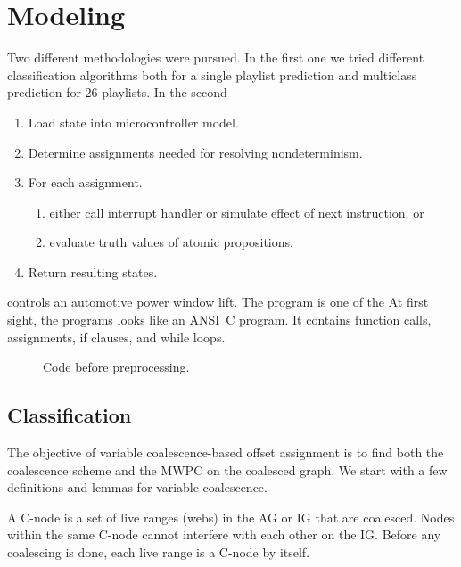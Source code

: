 \documentclass[acmtog, authorversion]{acmart}
\begin{document}
\section{Modeling}
\label{sec:sim}

Two different methodologies were pursued. In the first one we tried different classification algorithms both for a single playlist prediction and multiclass prediction for 26 playlists. In the second
\begin{enumerate}
\item Load state into microcontroller model.
\item Determine assignments needed for resolving nondeterminism.
\item For each assignment.
      \begin{enumerate}
      \item either call interrupt handler or simulate effect of next instruction, or
      \item evaluate truth values of atomic propositions.
      \end{enumerate}
\item Return resulting states.
\end{enumerate}
controls an automotive power window lift. The program is one of the
At first sight, the programs looks like an ANSI~C program. It
contains function calls, assignments, if clauses, and while loops.
\begin{figure}
  \caption{Code before preprocessing.}
  \label{fig:one}
\end{figure}

\subsection{Classification}

The objective of variable coalescence-based offset assignment is to find
both the coalescence scheme and the MWPC on the coalesced graph. We start
with a few definitions and lemmas for variable coalescence.

\begin{definition}A C-node is a set of
live ranges (webs) in the AG or IG that are coalesced. Nodes within the same
C-node cannot interfere with each other on the IG. Before any coalescing is
done, each live range is a C-node by itself.
\end{definition}
\end{document}
